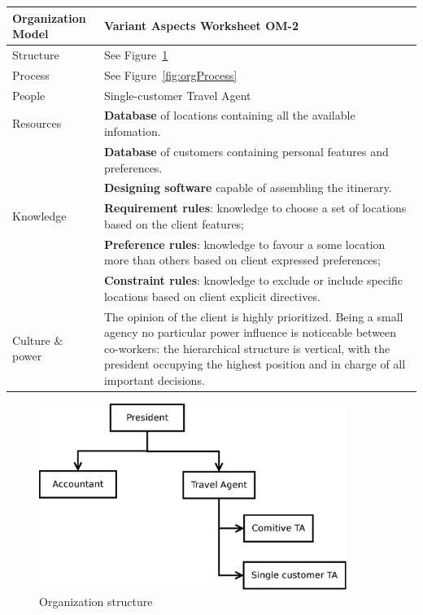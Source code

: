 \begin{tabular}%
       {|p{3cm}%
        |p{9.5cm}|}
\hline
{\bf Organization Model} &
   {\bf Variant Aspects Worksheet OM-2} \\
\hline
\hline
\sc Structure &
   {\rm
   See Figure~\ref{fig:orgStructure}
   } \\ %
\hline
\sc Process &
   {\rm
   See Figure~\ref{fig:orgProcess}
   } \\ %
\hline
\sc People &
   {\rm
   Single-customer Travel Agent
   } \\
\hline
\sc Resources &
   {\rm \textbf{Database} of locations containing all the available infomation.} \\
 & {\rm \textbf{Database} of customers containing personal features and preferences.} \\
 & {\rm \textbf{Designing software} capable of assembling the itinerary.} \\
\hline
\sc Knowledge &
   {\rm \textbf{Requirement rules}: knowledge to choose a set of locations based on the client features;} \\
 & {\rm \textbf{Preference rules}: knowledge to favour a some location more than others based on client expressed preferences;}\\
 & {\rm \textbf{Constraint rules}: knowledge to exclude or include specific locations based on client explicit directives.}\\
\hline
\sc Culture \& power &
   {\rm The opinion of the client is highly prioritized. Being a small agency no particular power influence is noticeable between co-workers: the hierarchical structure is vertical, with the president occupying the highest position and in charge of all important decisions.} \\
\hline
\end{tabular}

\begin{figure}[h]
\centering
\includegraphics[width=10cm]{images/azienda.eps}
\caption{Organization structure}
\label{fig:orgStructure}
\end{figure}

